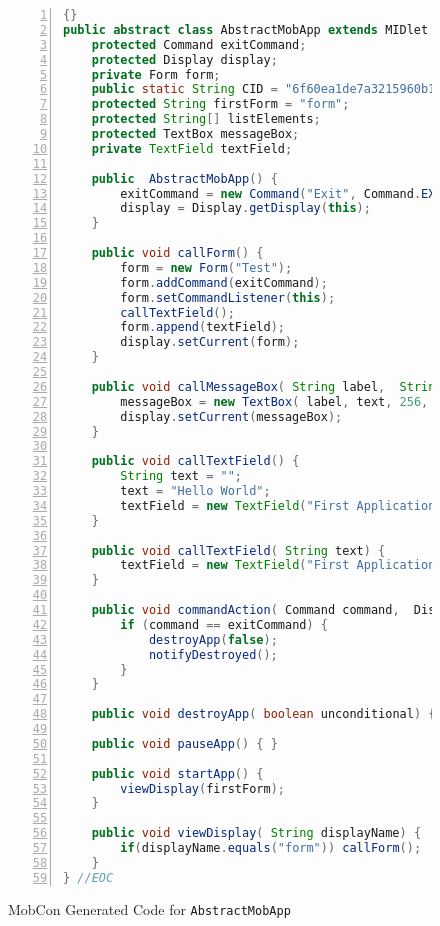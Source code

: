 \begin{figure}[ht]
	\begin{center}
	\begin{minipage}{15cm}
		\begin{scriptsize}
\begin{lstlisting}[numbers=left,language=Java,frame=leftline,showstringspaces=false]{}
public abstract class AbstractMobApp extends MIDlet implements CommandListener {
	protected Command exitCommand;
	protected Display display;
	private Form form;
	public static String CID = "6f60ea1de7a3215960b1209c817dad99";
	protected String firstForm = "form";
	protected String[] listElements;
	protected TextBox messageBox;
	private TextField textField;

	public  AbstractMobApp() {
		exitCommand = new Command("Exit", Command.EXIT, 1);
		display = Display.getDisplay(this);
	}

	public void callForm() {
		form = new Form("Test");
		form.addCommand(exitCommand);
		form.setCommandListener(this);
		callTextField();
		form.append(textField);
		display.setCurrent(form);
	}

	public void callMessageBox( String label,  String text) {
		messageBox = new TextBox( label, text, 256, TextField.ANY );
		display.setCurrent(messageBox);
	}

	public void callTextField() {
		String text = "";
		text = "Hello World";
		textField = new TextField("First Application", text, 256, TextField.ANY);
	}

	public void callTextField( String text) {
		textField = new TextField("First Application", text, 256, TextField.ANY);
	}

	public void commandAction( Command command,  Displayable screen) {
		if (command == exitCommand) {
			destroyApp(false);
			notifyDestroyed();
		}
	}

	public void destroyApp( boolean unconditional) { }

	public void pauseApp() { }

	public void startApp() {
		viewDisplay(firstForm);
	}

	public void viewDisplay( String displayName) {
		if(displayName.equals("form")) callForm();
	}
} //EOC
\end{lstlisting}
		\end{scriptsize}
		\end{minipage}
	\end{center}
	\caption{MobCon Generated Code for \texttt{AbstractMobApp}}
\label{fig:mc.app.gen}
\end{figure}

